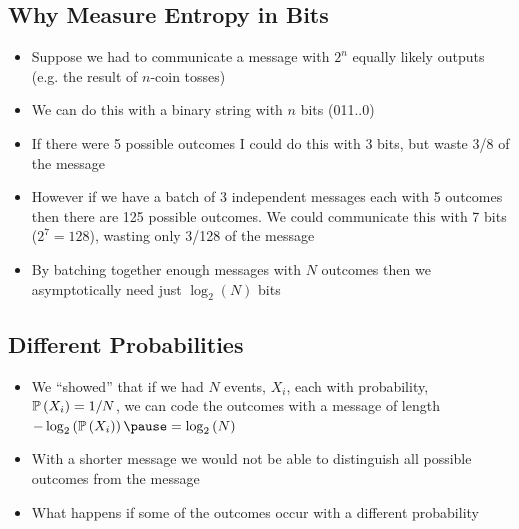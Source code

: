 \begin{slide}
\section[-2]{Why Measure Entropy in Bits}
  
\begin{PauseHighLight}
  \begin{itemize}
  \item Suppose we had to communicate a message with $2^n$ equally
    likely outputs (e.g. the result of $n$-coin tosses)\pause
  \item We can do this with a binary string with $n$ bits
    (011..0)\pause
  \item If there were 5 possible outcomes I could do this with 3 bits,
    but waste 3/8 of the message\pause
  \item However if we have a batch of 3 independent messages each with 5
    outcomes then there are 125 possible outcomes\pause.  We could communicate
    this with 7 bits ($2^7=128$), wasting only 3/128 of the
    message\pauseb
  \item By batching together enough messages  with $N$ outcomes then
    we asymptotically  need just $\log_2(N)$ bits\pause
  \end{itemize}
\end{PauseHighLight}

\end{slide}


\begin{slide}
\section[-2]{Different Probabilities}

\pb
  \begin{itemize}
  \item We ``showed'' that if we had $N$ events, $X_i$, each with
    probability, $\mathbb{P}\left( X_i \right) = 1/N$, we can code the outcomes with a
    message of length $-\logtwo{\Prob{X_i}}\pause=\logtwo{N}$\pauseb
  \item With a shorter message we would not be able to distinguish all
    possible outcomes from the message\pauseh
  \item What happens if some of the outcomes occur with a different probability\pauseh {}
    \begin{center}
      \pause
    \end{center}
  \end{itemize}

\end{slide}

